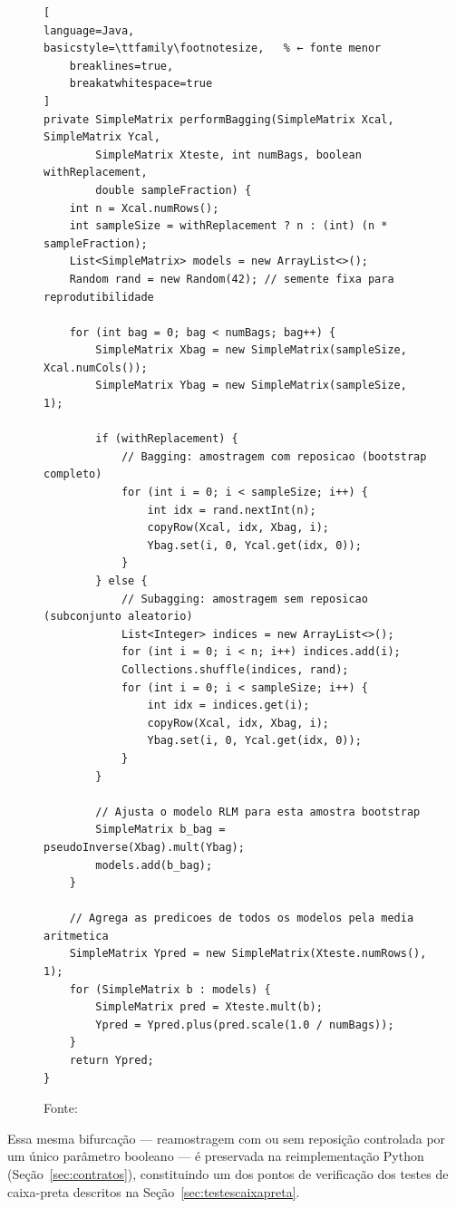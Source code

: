 \begin{figure}[H]
\centering
\caption{Ensemble de Bagging/Subagging (\texttt{BaggingOptimized.java}).}
\label{lst:performbagging}
\begin{lstlisting}[
language=Java,
basicstyle=\ttfamily\footnotesize,   % ← fonte menor
    breaklines=true,
    breakatwhitespace=true
]
private SimpleMatrix performBagging(SimpleMatrix Xcal, SimpleMatrix Ycal,
        SimpleMatrix Xteste, int numBags, boolean withReplacement,
        double sampleFraction) {
    int n = Xcal.numRows();
    int sampleSize = withReplacement ? n : (int) (n * sampleFraction);
    List<SimpleMatrix> models = new ArrayList<>();
    Random rand = new Random(42); // semente fixa para reprodutibilidade

    for (int bag = 0; bag < numBags; bag++) {
        SimpleMatrix Xbag = new SimpleMatrix(sampleSize, Xcal.numCols());
        SimpleMatrix Ybag = new SimpleMatrix(sampleSize, 1);

        if (withReplacement) {
            // Bagging: amostragem com reposicao (bootstrap completo)
            for (int i = 0; i < sampleSize; i++) {
                int idx = rand.nextInt(n);
                copyRow(Xcal, idx, Xbag, i);
                Ybag.set(i, 0, Ycal.get(idx, 0));
            }
        } else {
            // Subagging: amostragem sem reposicao (subconjunto aleatorio)
            List<Integer> indices = new ArrayList<>();
            for (int i = 0; i < n; i++) indices.add(i);
            Collections.shuffle(indices, rand);
            for (int i = 0; i < sampleSize; i++) {
                int idx = indices.get(i);
                copyRow(Xcal, idx, Xbag, i);
                Ybag.set(i, 0, Ycal.get(idx, 0));
            }
        }

        // Ajusta o modelo RLM para esta amostra bootstrap
        SimpleMatrix b_bag = pseudoInverse(Xbag).mult(Ybag);
        models.add(b_bag);
    }

    // Agrega as predicoes de todos os modelos pela media aritmetica
    SimpleMatrix Ypred = new SimpleMatrix(Xteste.numRows(), 1);
    for (SimpleMatrix b : models) {
        SimpleMatrix pred = Xteste.mult(b);
        Ypred = Ypred.plus(pred.scale(1.0 / numBags));
    }
    return Ypred;
}
\end{lstlisting}
\caption*{Fonte: \oautor}
\end{figure}

Essa mesma bifurcação --- reamostragem com ou sem reposição controlada por um
único parâmetro booleano --- é preservada na reimplementação Python
(Seção~\ref{sec:contratos}), constituindo um dos pontos de
verificação dos testes de caixa-preta descritos na
Seção~\ref{sec:testescaixapreta}.


